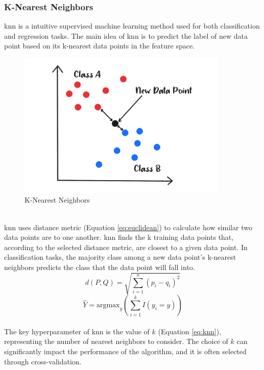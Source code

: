 \subsubsection{K-Nearest Neighbors}
\nocite{srivastava_2019_introduction}
\nocite{geeksforgeeks_2018_knearest}
\nocite{harrison_2018_machine}
\gls{knn} is a intuitive supervised machine learning method used for both classification and regression tasks. 
The main idea of \gls{knn} is to predict the label of new data point based on its k-nearest data points in the feature space. \citep{ibm_what_knn}
\\
\begin{figure}[!ht]
    \centering
    \includegraphics[width=10cm]{Images/knn.png}
    \caption{K-Nearest Neighbors}
    \label{fig:knn}
\end{figure}
\\
\indent \gls{knn} uses distance metric (Equation \ref{eq:euclidean}) to calculate how similar two data points are to one another.
\gls{knn} finds the k training data points that, according to the selected distance metric, are closest to a given data point.
In classification tasks, the majority class among a new data point's k-nearest neighbors predicts the class that the data point will fall into.
\\
\begin{equation} \label{eq:euclidean}
    d(P,Q) = \sqrt{\sum_{i=1}^{n}(p_{i} - q_{i})^{2}}
\end{equation}
\begin{equation} \label{eq:knn}
    \hat{Y} = \text{argmax}_y \left( \sum_{i=1}^{k}I(y_{i}=y) \right)
\end{equation}
\\
\indent The key hyperparameter of \gls{knn} is the value of $k$ (Equation \ref{eq:knn}), representing the number of nearest neighbors to consider.
The choice of $k$ can significantly impact the performance of the algorithm, and it is often selected through cross-validation.

